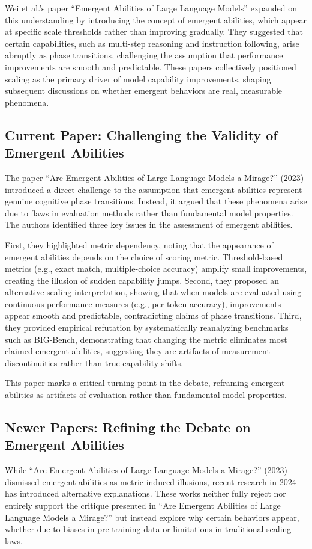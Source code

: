 \documentclass[10pt,a4paper]{article}
\begin{document}
Wei et al.'s paper ``Emergent Abilities of Large Language Models'' expanded on this understanding by introducing the concept of emergent abilities, which appear at specific scale thresholds rather than improving gradually. They suggested that certain capabilities, such as multi-step reasoning and instruction following, arise abruptly as phase transitions, challenging the assumption that performance improvements are smooth and predictable. These papers collectively positioned scaling as the primary driver of model capability improvements, shaping subsequent discussions on whether emergent behaviors are real, measurable phenomena.

\subsection{Current Paper: Challenging the Validity of Emergent Abilities}
The paper ``Are Emergent Abilities of Large Language Models a Mirage?'' (2023) \citep{mirage2023} introduced a direct challenge to the assumption that emergent abilities represent genuine cognitive phase transitions. Instead, it argued that these phenomena arise due to flaws in evaluation methods rather than fundamental model properties. The authors identified three key issues in the assessment of emergent abilities.

First, they highlighted metric dependency, noting that the appearance of emergent abilities depends on the choice of scoring metric. Threshold-based metrics (e.g., exact match, multiple-choice accuracy) amplify small improvements, creating the illusion of sudden capability jumps. Second, they proposed an alternative scaling interpretation, showing that when models are evaluated using continuous performance measures (e.g., per-token accuracy), improvements appear smooth and predictable, contradicting claims of phase transitions. Third, they provided empirical refutation by systematically reanalyzing benchmarks such as BIG-Bench, demonstrating that changing the metric eliminates most claimed emergent abilities, suggesting they are artifacts of measurement discontinuities rather than true capability shifts.

This paper marks a critical turning point in the debate, reframing emergent abilities as artifacts of evaluation rather than fundamental model properties.

\subsection{Newer Papers: Refining the Debate on Emergent Abilities}
While ``Are Emergent Abilities of Large Language Models a Mirage?'' (2023) dismissed emergent abilities as metric-induced illusions, recent research in 2024 has introduced alternative explanations. These works neither fully reject nor entirely support the critique presented in ``Are Emergent Abilities of Large Language Models a Mirage?'' but instead explore why certain behaviors appear, whether due to biases in pre-training data or limitations in traditional scaling laws.
\end{document}
